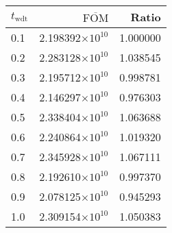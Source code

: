 \begin{tabular}{lrr}
\toprule
$t_{\mathrm{wdt}}$ & $\overline{\mathrm{FOM}}$ &    Ratio \\
\midrule
               0.1 &  2.198392$\times 10^{10}$ & 1.000000 \\
               0.2 &  2.283128$\times 10^{10}$ & 1.038545 \\
               0.3 &  2.195712$\times 10^{10}$ & 0.998781 \\
               0.4 &  2.146297$\times 10^{10}$ & 0.976303 \\
               0.5 &  2.338404$\times 10^{10}$ & 1.063688 \\
               0.6 &  2.240864$\times 10^{10}$ & 1.019320 \\
               0.7 &  2.345928$\times 10^{10}$ & 1.067111 \\
               0.8 &  2.192610$\times 10^{10}$ & 0.997370 \\
               0.9 &  2.078125$\times 10^{10}$ & 0.945293 \\
               1.0 &  2.309154$\times 10^{10}$ & 1.050383 \\
\bottomrule
\end{tabular}
